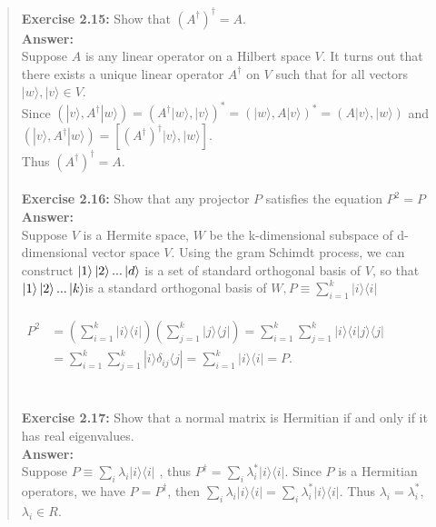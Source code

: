 \documentclass[UTF8]{ctexart}
\begin{document}
\begin{quote}
\textbf{Exercise 2.15:} Show that $\left(A^{\dagger}\right)^{\dagger}=A.$  \\
	\textbf{Answer:}\\
		 	 \hspace*{0.6cm}Suppose $A$ is any linear operator on a Hilbert space $V$. It turns out that there exists a unique linear operator $A^{\dagger}$ on $ V$ such that for all vectors $ |w\rangle ,| v\rangle \in V$. \\ 
Since $\left(|v\rangle, A^{\dagger}|w\rangle\right)=\left(A^{\dagger}|w\rangle,|v\rangle\right)^{*}=\left(|w\rangle, A|v\rangle\right)^{*}=\left(A|v\rangle,|w\rangle\right)$
	and $\left(|v\rangle, A^{\dagger}|w\rangle\right)=\left[\left(A^{\dagger}\right)^{\dagger}|v\rangle,|w\rangle\right].$
	\\
	Thus $\left(A^{\dagger}\right)^{\dagger}=A$.\\
	\\
\textbf{Exercise 2.16:} Show that any projector $P$ satisfies the equation $P^{2}=P$ \\
\textbf{Answer:}\\
	 \hspace*{0.6cm}Suppose $V$ is a Hermite space, $W$ be the k-dimensional subspace of d-dimensional vector space $V$. Using the gram Schimdt process, we can construct $ \ket{1} \ket{2} . . .\ket{d}$ is a set of standard orthogonal basis of $V$, so that $ \ket{1} \ket{2} . . .\ket{k} $is a standard orthogonal basis of $W  ,P \equiv \sum_{i=1}^{k}|i\rangle\langle i|$ \\ \\
	$\begin{aligned} P^{2} &=(\sum_{i=1}^{k}|i\rangle\langle i|)(\sum_{j=1}^{k}|j\rangle\langle j|)=\sum_{i=1}^{k}\sum_{j=1}^{k}|i\rangle\langle i | j\rangle\langle j| \\ 	&=\sum_{i=1}^{k}\sum_{j=1}^{k}|i\rangle \delta_{i j}\langle j|=\sum_{i=1}^{k}| i\rangle\langle i|=P. \end{aligned}$\\  \\ \\
\textbf{Exercise 2.17:} Show that a normal matrix is Hermitian if and only if it has real eigenvalues.
	\\ 
	\textbf{Answer:}\\
	 \hspace*{0.6cm}Suppose $P\equiv \sum_{i}\lambda_{i}|i\rangle\langle i|$ , thus  $P^{\dagger} = \sum_{i}\lambda_{i}^{*}|i\rangle\langle i|$.
	Since $P$ is a Hermitian operators, we have $P=P^{\dagger}$, then $\sum_{i}\lambda_{i}|i\rangle\langle i|= \sum_{i}\lambda_{i}^{*}|i\rangle\langle i|$. Thus $\lambda_{i} =\lambda_{i}^{*}$, $\lambda_{i} \in R$.

\end{quote}
\end{document}
